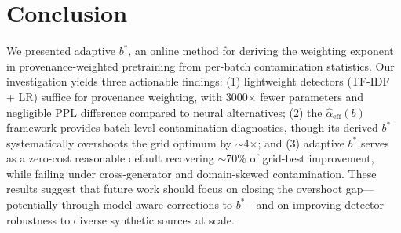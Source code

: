 \documentclass[11pt]{article}
\begin{document}
\section{Conclusion}
\label{sec:conclusion}

We presented adaptive $b^*$, an online method for deriving the weighting exponent in provenance-weighted pretraining from per-batch contamination statistics.
Our investigation yields three actionable findings: (1) lightweight detectors (TF-IDF + LR) suffice for provenance weighting, with 3000$\times$ fewer parameters and negligible PPL difference compared to neural alternatives; (2) the $\hat{\alpha}_{\mathrm{eff}}(b)$ framework provides batch-level contamination diagnostics, though its derived $b^*$ systematically overshoots the grid optimum by $\sim$4$\times$; and (3) adaptive $b^*$ serves as a zero-cost reasonable default recovering $\sim$70\% of grid-best improvement, while failing under cross-generator and domain-skewed contamination.
These results suggest that future work should focus on closing the overshoot gap---potentially through model-aware corrections to $b^*$---and on improving detector robustness to diverse synthetic sources at scale.


\end{document}
